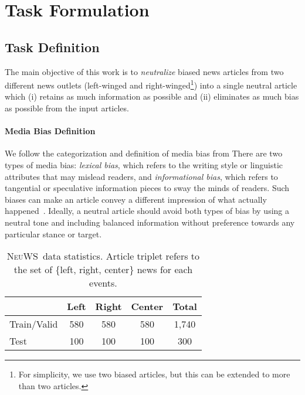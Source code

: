 \documentclass[11pt,a4paper]{article}
\newcommand{\ourdata}{{\scshape NeuWS}}
\begin{document}
\section{Task Formulation}
\subsection{Task Definition}
\label{sec:task_definition}
The main objective of this work is to \textit {neutralize} biased news articles from two different news outlets (left-winged and right-winged\footnote{For simplicity, we use two biased articles, but this can be extended to more than two articles.}) into a single neutral article which (i) retains as much information as possible and (ii) eliminates as much bias as possible from the input articles.

\paragraph{Media Bias Definition} We follow the categorization and definition of media bias from \citeauthor{fan2019plain} There are two types of media bias: \textit{lexical bias}, which refers to the writing style or linguistic attributes that may mislead readers, and \textit{informational bias}, which refers to tangential or speculative information pieces to sway the minds of readers. Such biases can make an article convey a different impression of what actually happened~\cite{gentzkow2006media}. Ideally, a neutral article should avoid both types of bias by using a neutral tone and including balanced information without preference towards any particular stance or target.


\begin{table}[]
\centering
\small
\begin{tabular}{lccc|c}
\toprule
 & Left & Right & Center & Total \\ \midrule
Train/Valid & 580 & 580 & 580 & 1,740 \\
Test & 100 & 100 & 100 & 300 \\ \bottomrule
\end{tabular}
\caption{\ourdata~data statistics. Article triplet refers to the set of \{left, right, center\} news for each events.}
\label{table:stat}
\end{table}
\end{document}
